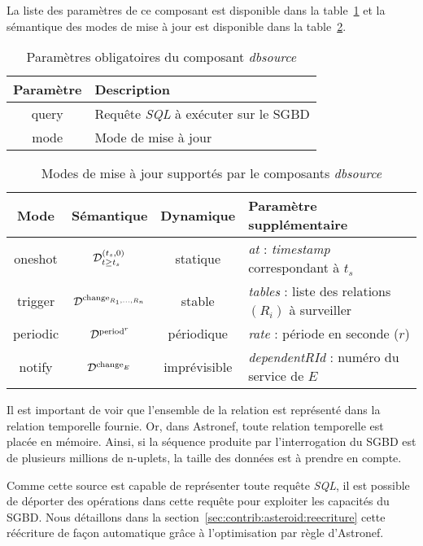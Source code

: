 La liste des paramètres de ce composant est disponible dans la table~\ref{tab:contrib:asteroid:dbsource} et la sémantique des modes de mise à jour est disponible dans la table~\ref{tab:contrib:asteroid:dbsource:modes}.
\begin{table}[ht]
    \centering
    \begin{tabular}{cl}
        Paramètre & Description \\ \midrule
        query & Requête \textit{SQL} à exécuter sur le SGBD \\
        mode & Mode de mise à jour
    \end{tabular}
    \caption{Paramètres obligatoires du composant \textit{dbsource}}\label{tab:contrib:asteroid:dbsource}
\end{table}
\begin{table}[ht]
    \centering
    \begin{tabular}{cccl}
        Mode & Sémantique & Dynamique & Paramètre supplémentaire \\ \midrule
        oneshot & $\mathcal{D}^{(t_s,0)}_{t\geq t_s}$ & statique & \textit{at} : \textit{timestamp} correspondant à $t_s$\\
        trigger & $\mathcal{D}^{\mathrm{change}_{R_1,...,R_n}}$ & stable & \textit{tables} : liste des relations $(R_i)$ à surveiller \\
        periodic & $\mathcal{D}^{\mathrm{period}^{r}}$ & périodique & \textit{rate} : période en seconde ($r$)\\
        notify & $\mathcal{D}^{\mathrm{change}_{E}}$ & imprévisible & \textit{dependentRId} : numéro du service de $E$
    \end{tabular}
    \caption{Modes de mise à jour supportés par le composants \textit{dbsource}}\label{tab:contrib:asteroid:dbsource:modes}
\end{table}

Il est important de voir que l'ensemble de la relation est représenté dans la relation temporelle fournie. Or, dans Astronef, toute relation temporelle est placée en mémoire. Ainsi, si la séquence produite par l'interrogation du SGBD est de plusieurs millions de n-uplets, la taille des données est à prendre en compte. 

Comme cette source est capable de représenter toute requête \textit{SQL}, il est possible de déporter des opérations dans cette requête pour exploiter les capacités du SGBD. Nous détaillons dans la section~\ref{sec:contrib:asteroid:reecriture} cette réécriture de façon automatique grâce à l'optimisation par règle d'Astronef.

